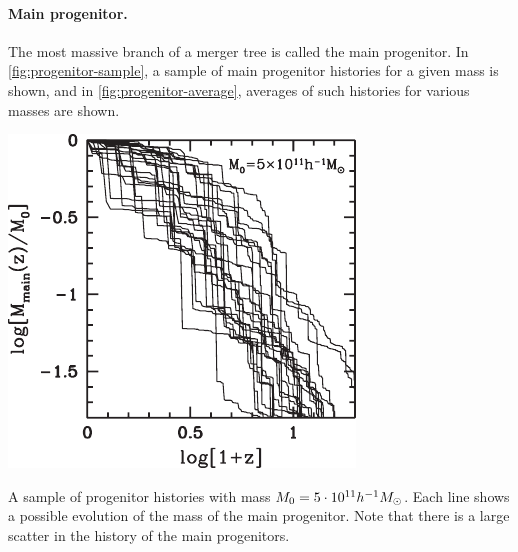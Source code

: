 \paragraph*{Main progenitor.}
The most massive branch of a merger tree is called the main progenitor.
In \cref{fig:progenitor-sample}, a sample of main progenitor histories for a given mass is shown, and in \cref{fig:progenitor-average}, averages of such histories for various masses are shown.

\begin{marginfigure}
	\includegraphics[width=\textwidth]{img/ch-04/progenitor-sample.pdf}
	\caption{A sample of progenitor histories with mass $M_0 = \num{5e11} h^{-1} M_\odot$.
	Each line shows a possible evolution of the mass of the main progenitor.
	Note that there is a large scatter in the history of the main progenitors.}
	\label{fig:progenitor-sample}
\end{marginfigure}

